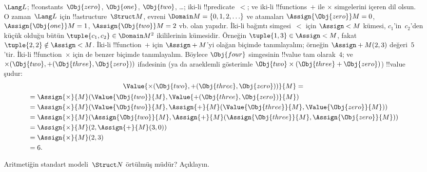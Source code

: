 \documentclass[../../../include/open-logic-section]{subfiles}
\begin{document}
\begin{ex}
$\Lang L$; !!{constant}s~$\Obj{zero}$, $\Obj{one}$, $\Obj{two}$,
\dots; iki-li !!{predicate}~$<$; ve iki-li !!{function}s~$+$ ile
$\times$ simgelerini içeren dil olsun. O zaman~$\Lang L$ için
!!a{structure}~$\Struct M$, evreni
$\Domain M=\{0,1,2,\ldots\}$ ve atamaları
$\Assign{\Obj{zero}}M=0$, $\Assign{\Obj{one}}M=1$,
$\Assign{\Obj{two}}M=2$ vb. olan yapıdır. İki-li bağıntı simgesi~$<$
için $\Assign< M$ kümesi, $c_1$'in~$c_2$'den küçük olduğu bütün
$\tuple{c_1,c_2}\in\Domain M^2$ ikililerinin kümesidir. Örneğin
$\tuple{1,3}\in\Assign< M$, fakat $\tuple{2,2}\notin\Assign< M$.
İki-li !!{function}~$+$ için $\Assign+M$'yi olağan biçimde
tanımlayalım; örneğin $\Assign+M(2,3)$ değeri~$5$'tir. İki-li
!!{function}~$\times$ için de benzer biçimde tanımlayalım. Böylece
$\Obj{four}$ simgesinin !!{value} tam olarak~$4$; ve
$\times(\Obj{two},+(\Obj{three},\Obj{zero}))$ ifadesinin (ya da
araeklemli gösterimle
$\Obj{two}\times(\Obj{three}+\Obj{zero})$) !!{value} şudur:
\begin{multline*}
\Value{\times(\Obj{two}, +(\Obj{three},\Obj{zero}))}{M} =\\
\begin{aligned}
& =\Assign{\times}{M}(\Value{\Obj{two}}{M}, \Value{+(\Obj{three}, \Obj{zero})}{M})\\
& = \Assign{\times}{M}(\Value{\Obj{two}}{M}, \Assign{+}{M}(\Value{\Obj{three}}{M},
\Value{\Obj{zero}}{M})) \\
& = \Assign{\times}{M}(\Assign{\Obj{two}}{M}, \Assign{+}{M}(\Assign{\Obj{three}}{M},
\Assign{\Obj{zero}}{M})) \\
& = \Assign{\times}{M}(2, \Assign{+}{M}(3, 0)) \\
& = \Assign{\times}{M}(2, 3) \\
& = 6.
\end{aligned}
\end{multline*}
\end{ex}

\begin{prob}
Aritmetiğin standart modeli~$\Struct N$ örtülmüş müdür? Açıklayın.
\end{prob}
\end{document}

